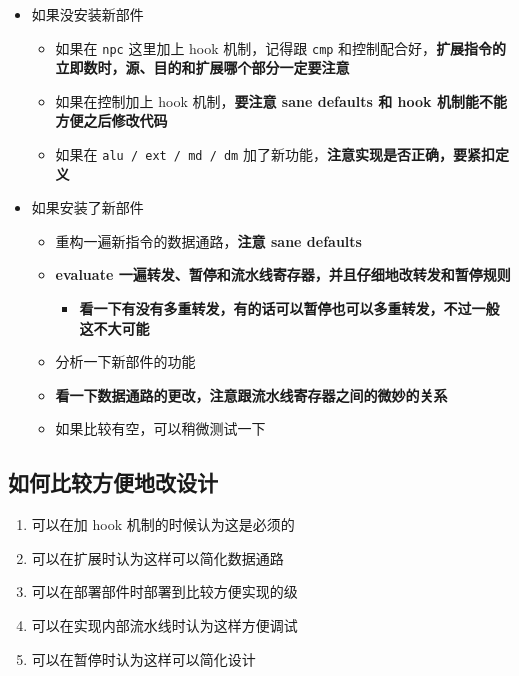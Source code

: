 \documentclass[12pt,AutoFakeBold,AutoFakeSlant]{article}
\providecommand{\tightlist}{%
  \setlength{\itemsep}{0pt}\setlength{\parskip}{0pt}}
\begin{document}
\begin{itemize}
\tightlist
\item
  如果没安装新部件

  \begin{itemize}
  \tightlist
  \item
    如果在 \texttt{npc} 这里加上 hook 机制，记得跟 \texttt{cmp}
    和控制配合好，\textbf{扩展指令的立即数时，源、目的和扩展哪个部分一定要注意}
  \item
    如果在控制加上 hook 机制，\textbf{要注意 sane defaults 和 hook
    机制能不能方便之后修改代码}
  \item
    如果在 \texttt{alu\ /\ ext\ /\ md\ /\ dm}
    加了新功能，\textbf{注意实现是否正确，要紧扣定义}
  \end{itemize}
\item
  如果安装了新部件

  \begin{itemize}
  \tightlist
  \item
    重构一遍新指令的数据通路，\textbf{注意 sane defaults}
  \item
    \textbf{evaluate
    一遍转发、暂停和流水线寄存器，并且仔细地改转发和暂停规则}

    \begin{itemize}
    \tightlist
    \item
      \textbf{看一下有没有多重转发，有的话可以暂停也可以多重转发，不过一般这不大可能}
    \end{itemize}
  \item
    分析一下新部件的功能
  \item
    \textbf{看一下数据通路的更改，注意跟流水线寄存器之间的微妙的关系}
  \item
    如果比较有空，可以稍微测试一下
  \end{itemize}
\end{itemize}

\hypertarget{ux5982ux4f55ux6bd4ux8f83ux65b9ux4fbfux5730ux6539ux8bbeux8ba1}{%
\subsection{如何比较方便地改设计}\label{ux5982ux4f55ux6bd4ux8f83ux65b9ux4fbfux5730ux6539ux8bbeux8ba1}}

\begin{enumerate}
\def\labelenumi{\arabic{enumi}.}
\tightlist
\item
  可以在加 hook 机制的时候认为这是必须的
\item
  可以在扩展时认为这样可以简化数据通路
\item
  可以在部署部件时部署到比较方便实现的级
\item
  可以在实现内部流水线时认为这样方便调试
\item
  可以在暂停时认为这样可以简化设计
\end{enumerate}
\end{document}
